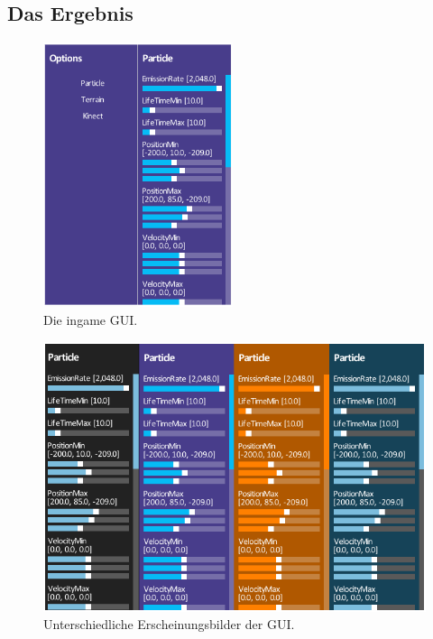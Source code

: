 \begin{Spacing}{\mylinespace}
\begin{description}
\end{description}

\subsection{Das Ergebnis}

\begin{figure}[h!]
	\centering
	\vspace*{30px}
	\includegraphics[width=210px]{graphics/newGui.png}
	\caption{Die ingame GUI.}
	\label{fig:NewGUI}
\end{figure}

\begin{figure}[h!]
	\centering
	\vspace*{30px}
	\includegraphics[width=\columnwidth]{graphics/guiThemes.png}
	\caption{Unterschiedliche Erscheinungsbilder der GUI.}
	\label{fig:GUIThemes}
\end{figure}

\end{Spacing}
\newpage

